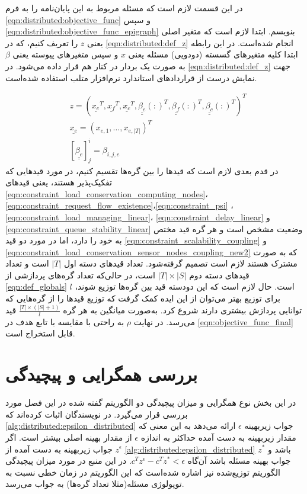 	در این قسمت لازم است که مسئله مربوط به این پایان‌نامه را به فرم \cref{eqn:distributed:objective_func} و سپس \cref{eqn:distributed:objective_func_epigraph} بنویسم. ابتدا لازم است که متغیر اصلی یعنی $z$ را تعریف کنیم، که در \cref{eqn:distributed:def_z} انجام شده‌است. در این رابطه ابتدا کلیه متغیرهای گسسته (دودویی) مسئله یعنی $x$  و سپس متغیرهای پیوسته یعنی $\beta$ به صورت یک بردار در کنار هم قرار داده می‌شود. در \cref{eqn:distributed:def_z} جهت نمایش درست از قراردادهای استاندارد نرم‌افزار متلب استفاده شده‌است. 
	
\begin{subequations}\label{eqn:distributed:def_z}
	\begin{align}
		&z = (\underline{x_e}^T, \underline{x_f}^T, \underline{x_c}^T, \underline{\underline{\beta_{e}}}(:)^T, \underline{\underline{\beta_{f}}}(:)^T, \underline{\underline{\beta_{c}}}(:)^T)^T \\
		&\underline{x_e} = (x_{e,1}, \dots, x_{e,|T|})^T \\
		&[\underline{\underline{\beta_{e}}}]^i_j = \beta_{i,j,e}
	\end{align}
\end{subequations}
در قدم بعدی لازم است که قیدها را بین گره‌ها تقسیم کنیم، در مورد قیدهایی که تفکیک‌پذیر هستند، یعنی قیدهای \cref{eqn:constraint_load_conservation_computing_nodes}، \cref{eqn:constraint_request_flow_existence}،\cref{eqn:constraint_psi} ، \cref{eqn:constraint_load_managing_linear}، \cref{eqn:constraint_delay_linear} و \cref{eqn:constraint_queue_stability_linear} وضعیت مشخص است و هر گره قید مختص به خود را دارد، اما در مورد دو قید \cref{eqn:constraint_scalability_coupling} و \cref{eqn:constraint_load_conservation_sensor_nodes_coupling_new2} که به صورت مشترک هستند لازم است تصمیم گرفته‌شود. تعداد قیدهای دسته اول $|T|$ است و تعداد قیدهای دسته دوم $|T| \times |S|$ است، در حالی‌که تعداد گره‌های پردازشی از \cref{eqn:def_globals} $l$ است. حال لازم است که این دودسته قید بین گره‌ها توزیع شوند، برای توزیع بهتر می‌توان از این ایده کمک گرفت که توزیع قیدها را از گره‌هایی که توانایی پردازش بیشتری دارند شروع کرد. به‌صورت میانگین به هر گره $\frac{|T|\times(|S|+1)}{l}$ قید می‌رسد. در نهایت $\rho$ به راحتی با مقایسه با تابع هدف در \cref{eqn:objective_func_final} قابل استخراج است. 

\section{بررسی همگرایی و پیچیدگی}
	در این بخش نوع همگرایی و میزان پیچیدگی دو الگوریتم گفته شده در این فصل مورد بررسی قرار می‌گیرد. 
	در \cite{testa2019distributed} نویسندگان اثبات کرده‌اند که \cref{alg:distributed:epsilon_distributed} جواب زیربهینه $\epsilon$ ارائه می‌دهد به این معنی که مقدار زیربهینه به دست آمده حداکثر به اندازه $\epsilon$ از مقدار بهینه اصلی بیشتر است. اگر $z^\epsilon$ جواب زیربهینه به دست آمده از \cref{alg:distributed:epsilon_distributed} باشد و $z^*$ جواب بهینه مسئله باشد آن‌گاه $c^Tz^\epsilon - c^Tz^* < \epsilon$.
	در این منبع در مورد میزان پیچیدگی الگوریتم توزیع‌شده نیز اشاره شده‌است که این الگوریتم در زمان خطی نسبت به توپولوژی مسئله(مثلا تعداد گره‌ها) به جواب می‌رسد. 
	
